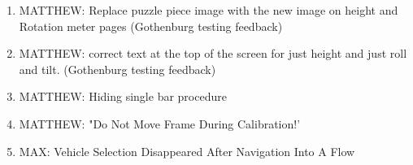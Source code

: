 \begin{enumerate}[leftmargin=!,labelindent=5pt,itemindent=-35pt]
\item {} MATTHEW: Replace puzzle piece image with the new image on height and Rotation meter pages (Gothenburg testing feedback)
\item {} MATTHEW: correct text at the top of the screen for just height and just roll and tilt. (Gothenburg testing feedback)
\item {} MATTHEW: Hiding single bar procedure
\item {} MATTHEW: "Do Not Move Frame During Calibration!'
\item {} MAX: Vehicle Selection Disappeared After Navigation Into A Flow
\end{enumerate}\vspace{.5cm}
